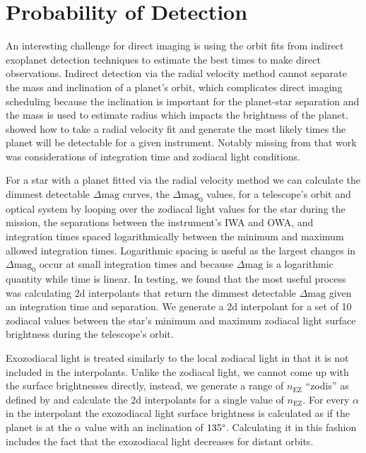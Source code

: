 
\section{Probability of Detection} %
\label{section:impact_on_pdet}

An interesting challenge for direct imaging is using the orbit fits from
indirect exoplanet detection techniques to estimate the best times to make
direct observations. Indirect detection via the radial velocity method cannot
separate the mass and inclination of a planet's orbit, which complicates direct
imaging scheduling because the inclination is important for the planet-star
separation and the mass is used to estimate radius which impacts the brightness
of the planet.  showed how to take a radial velocity fit and generate
the most likely times the planet will be detectable for a given instrument.
Notably missing from that work was considerations of integration time and
zodiacal light conditions.

For a star with a planet fitted via the radial velocity method we can calculate
the dimmest detectable $\Delta\textrm{mag}$ curves, the $\Delta\textrm{mag}_0$
values, for a telescope's orbit and optical system by looping over the zodiacal
light values for the star during the mission, the separations between the
instrument's IWA and OWA, and integration times spaced logarithmically between
the minimum and maximum allowed integration times. Logarithmic spacing is
useful as the largest changes in $\Delta\textrm{mag}_0$ occur at small
integration times and because $\Delta\textrm{mag}$ is a logarithmic quantity
while time is linear. In testing, we found that the most useful process was
calculating 2d interpolants that return the dimmest detectable
$\Delta\textrm{mag}$ given an integration time and separation. We generate a 2d
interpolant for a set of 10 zodiacal values between the star's minimum and
maximum zodiacal light surface brightness during the telescope's orbit. 

Exozodiacal light is treated similarly to the local zodiacal light in that it
is not included in the interpolants. Unlike the zodiacal light, we cannot come
up with the surface brightnesses directly, instead, we generate a range of
$n_\textrm{EZ}$ ``zodis'' as defined by
\citet{starkMaximizingExoEarthCandidate2014} and calculate the 2d interpolants
for a single value of $n_\textrm{EZ}$. For every $\alpha$ in the interpolant
the exozodiacal light surface brightness is calculated as if the planet is at
the $\alpha$ value with an inclination of $135\degree$. Calculating it in this
fashion includes the fact that the exozodiacal light decreases for distant
orbits.

